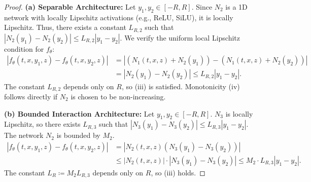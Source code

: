 \documentclass[10pt,a4paper]{amsart}
\newcommand{\abs}[1]{\left\lvert#1\right\rvert}
\begin{document}
\begin{proof}
\textbf{(a) Separable Architecture:} Let $y_1, y_2 \in [-R,R]$. Since $N_2$ is a 1D network with locally Lipschitz activations (e.g., ReLU, SiLU), it is locally Lipschitz. Thus, there exists a constant $L_{R,2}$ such that $\abs{N_2(y_1)-N_2(y_2)} \le L_{R,2}\abs{y_1-y_2}$. We verify the uniform local Lipschitz condition for $f_\theta$:
\begin{align*}
    \abs{f_\theta(t,x,y_1,z) - f_\theta(t,x,y_2,z)} &= \abs{(N_1(t,x,z) + N_2(y_1)) - (N_1(t,x,z) + N_2(y_2))} \\
    &= \abs{N_2(y_1) - N_2(y_2)} \le L_{R,2}\abs{y_1-y_2}.
\end{align*}
The constant $L_{R,2}$ depends only on $R$, so (iii) is satisfied. Monotonicity (iv) follows directly if $N_2$ is chosen to be non-increasing.

\textbf{(b) Bounded Interaction Architecture:} Let $y_1, y_2 \in [-R,R]$. $N_3$ is locally Lipschitz, so there exists $L_{R,3}$ such that $\abs{N_3(y_1)-N_3(y_2)} \le L_{R,3}\abs{y_1-y_2}$. The network $N_2$ is bounded by $M_2$.
\begin{align*}
    \abs{f_\theta(t,x,y_1,z) - f_\theta(t,x,y_2,z)} &= \abs{N_2(t,x,z)(N_3(y_1) - N_3(y_2))} \\
    &\le \abs{N_2(t,x,z)} \cdot \abs{N_3(y_1) - N_3(y_2)} \le M_2 \cdot L_{R,3} \abs{y_1 - y_2}.
\end{align*}
The constant $L_R \coloneqq M_2 L_{R,3}$ depends only on $R$, so (iii) holds.


\end{proof}
\end{document}
